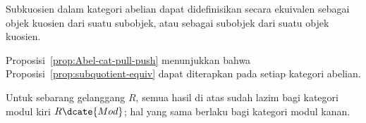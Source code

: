 \begin{korolari}\label{prop:Abel-cat-subquotient}
	Subkuosien dalam kategori abelian dapat didefinisikan secara ekuivalen
	sebagai objek kuosien dari suatu subobjek, atau sebagai subobjek dari suatu
	objek kuosien.
\end{korolari}
\begin{bukti}
	Proposisi~\ref{prop:Abel-cat-pull-push} menunjukkan bahwa
	Proposisi~\ref{prop:subquotient-equiv} dapat diterapkan pada setiap kategori
	abelian.
\end{bukti}

Untuk sebarang gelanggang $R$, semua hasil di atas sudah lazim bagi kategori
modul kiri $R\dcate{Mod}$; hal yang sama berlaku bagi kategori modul kanan.
